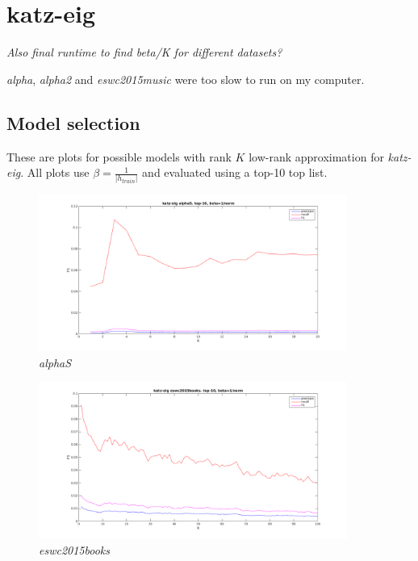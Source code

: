 
\section{katz-eig}\label{sec:graphs:katz-eig}


\textit{Also final runtime to find beta/K for different datasets?}

\textit{alpha}, \textit{alpha2} and \textit{eswc2015music} were too slow to run on my computer.


\subsection{Model selection}

These are plots for possible models with rank $K$ low-rank approximation for \textit{katz-eig}.  All plots use $\beta = \frac{1}{|h_{train}|}$ and evaluated using a top-10 top list.

\FloatBarrier

\begin{figure}[h!]
  \centering
    \includegraphics[width=0.9\textwidth]{fig/katzeig_k/alphaS_katzeig_K.png}
    \vspace{-20pt}
    \caption{\textit{alphaS}}
    \vspace{-10pt}
\end{figure}

\begin{figure}[h!]
  \centering
    \includegraphics[width=0.9\textwidth]{fig/katzeig_k/eswc2015books_katzeig_K.png}
    \vspace{-20pt}
    \caption{\textit{eswc2015books}}
    \vspace{-10pt}
\end{figure}

